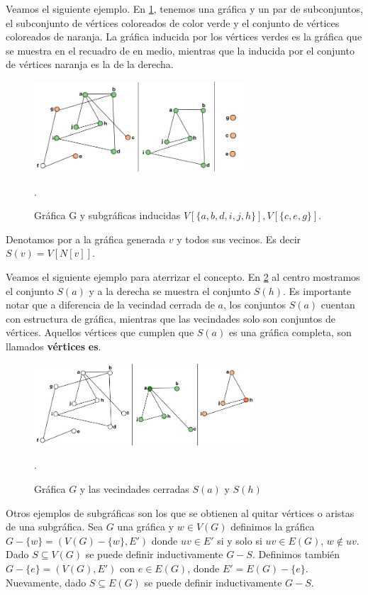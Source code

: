 Veamos el siguiente ejemplo. En \cref{fig:04}, tenemos una gráfica y un par de
subconjuntos, el subconjunto de vértices coloreados de color verde y el conjunto
de vértices coloreados de naranja. La gráfica inducida por los vértices verdes
es la gráfica que se muestra en el recuadro de en medio, mientras que la
inducida por el conjunto de vértices naranja es la de la derecha.

\begin{figure}[H]
  \centering
  \includegraphics[width=0.7\textwidth]{recursos/capturas/09.jpg}
  \caption{Gráfica G y subgráficas inducidas $V[\{ a,b,d,i,j,h\}], V[\{
  c,e,g\}]$.}.
  \label{fig:04}
\end{figure}

Denotamos por  a la gráfica generada $v$ y todos sus vecinos. Es
decir $S(v)=V[N[v]]$.

Veamos el siguiente ejemplo para aterrizar el concepto. En \cref{fig:05} al
centro mostramos el conjunto $S(a)$ y a la derecha se muestra el conjunto
$S(h)$. Es importante notar que a diferencia de la vecindad cerrada de $a$, los
conjuntos $S(a)$ cuentan con estructura de gráfica, mientras que las vecindades
solo son conjuntos de vértices. Aquellos vértices que cumplen que $S(a)$ es una
gráfica completa, son llamados \textbf{vértices}
\textbf{es}.

\begin{figure}[H]
  \centering
  \includegraphics[width=0.73\textwidth]{recursos/capturas/10.jpg}
  \caption{Gráfica $G$ y las vecindades cerradas $S(a)$ y $S(h)$}.
  \label{fig:05}
\end{figure}

Otros ejemplos de subgráficas son los que se obtienen al quitar vértices o
aristas de una subgráfica. Sea $G$ una gráfica y $w\in V(G)$ definimos la
gráfica $G-\{w\}=(V(G)-\{w\}, E')$ donde $uv\in E'$ si y solo si $uv\in E(G)$,
$w\notin uv$. Dado $S\subseteq V(G)$ se puede definir inductivamente $G-S$.
Definimos también $G-\{e\}=(V(G),E')$ con $e\in E(G)$, donde $E'=E(G)-\{e\}$.
Nuevamente, dado $S\subseteq E(G)$ se puede definir inductivamente $G-S$.


